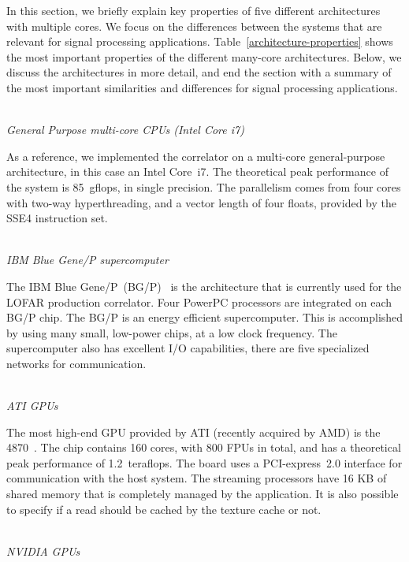 \documentclass{article}
\begin{document}
In this section, we briefly explain key properties of five different
architectures with multiple cores.  We focus on the differences
between the systems that are relevant for signal processing
applications. Table~\ref{architecture-properties} shows the most
important properties of the different many-core architectures. Below,
we discuss the architectures in more detail, and end the section with
a summary of the most important similarities and differences for signal processing applications.


\noindent \\ \emph{General Purpose multi-core CPUs (Intel Core i7)}

\noindent As a reference, we implemented the correlator on a multi-core
general-purpose architecture, in this case an Intel Core~i7.  The
theoretical peak performance of the system is 85~gflops, in single
precision.  The parallelism comes from four cores with two-way
hyperthreading, and a vector length of four floats, provided by the
SSE4 instruction set.

\noindent \\ \emph{IBM Blue Gene/P supercomputer}

\noindent The IBM Blue Gene/P~(BG/P)~\cite{IBM:08} is the architecture that is
currently used for the LOFAR production correlator.
Four PowerPC processors are integrated on each BG/P chip.
The BG/P is an energy efficient supercomputer.
This is accomplished by using many small, low-power chips, at a low clock
frequency.
The supercomputer also has excellent I/O capabilities, there are five
specialized networks for communication.


\noindent \\ \emph{ATI GPUs}

\noindent The most high-end GPU provided by ATI (recently acquired by AMD) is
the 4870~\cite{amd-manual}.  The chip contains 160 cores, with 800 FPUs in total, 
and has a theoretical peak performance of
1.2~teraflops. The board uses a PCI-express~2.0 interface
for communication with the host system.
The streaming processors have 16 KB of shared
memory that is completely managed by the application. It is also
possible to specify if a read should be
cached by the texture cache or not.



\noindent \\ \emph{NVIDIA GPUs}
\end{document}
